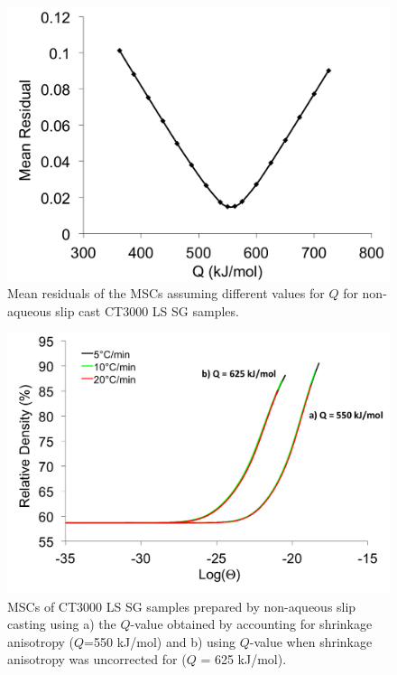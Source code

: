 \newpage
\begin{figure}[H]
	\centering
	\includegraphics[width=\textwidth]{Chapter-6/Figures/Figure4.png}
	\caption{Mean residuals of the MSCs assuming different values for $Q$ for non-aqueous slip cast CT3000 LS SG samples.}
	\label{Ch6-figure:Figure4}
\end{figure}

\newpage
\begin{figure}[H]
	\centering
	\includegraphics[width=\textwidth]{Chapter-6/Figures/Figure5.png}
	\caption{MSCs of CT3000 LS SG samples prepared by non-aqueous slip casting using a) the $Q$-value obtained by accounting for shrinkage anisotropy ($Q$=550 kJ/mol) and b) using $Q$-value when shrinkage anisotropy was uncorrected for ($Q$ = 625 kJ/mol).}
	\label{Ch6-figure:Figure5}
\end{figure}

